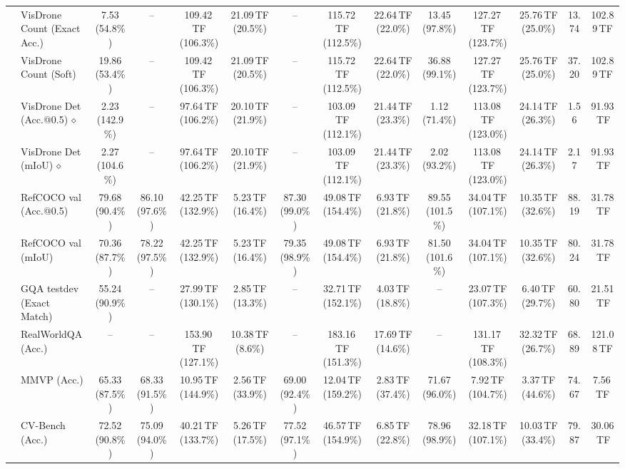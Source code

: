 \begin{table}[t]
\begin{center}
\begin{small}
\begin{sc}
{\begin{tabular}{llcccccccccccc}
& VisDrone Count (Exact Acc.) & 7.53 (54.8\%) & -- & 109.42\,TF (106.3\%) & 21.09\,TF (20.5\%) & -- & 115.72\,TF (112.5\%) & 22.64\,TF (22.0\%) & 13.45 (97.8\%) & 127.27\,TF (123.7\%) & 25.76\,TF (25.0\%) & 13.74 & 102.89\,TF \\
& VisDrone Count (Soft) & 19.86 (53.4\%) & -- & 109.42\,TF (106.3\%) & 21.09\,TF (20.5\%) & -- & 115.72\,TF (112.5\%) & 22.64\,TF (22.0\%) & 36.88 (99.1\%) & 127.27\,TF (123.7\%) & 25.76\,TF (25.0\%) & 37.20 & 102.89\,TF \\
& VisDrone Det (Acc.@0.5)\,$\diamond$ & 2.23 (142.9\%) & -- & 97.64\,TF (106.2\%) & 20.10\,TF (21.9\%) & -- & 103.09\,TF (112.1\%) & 21.44\,TF (23.3\%) & 1.12 (71.4\%) & 113.08\,TF (123.0\%) & 24.14\,TF (26.3\%) & 1.56 & 91.93\,TF \\
& VisDrone Det (mIoU)\,$\diamond$ & 2.27 (104.6\%) & -- & 97.64\,TF (106.2\%) & 20.10\,TF (21.9\%) & -- & 103.09\,TF (112.1\%) & 21.44\,TF (23.3\%) & 2.02 (93.2\%) & 113.08\,TF (123.0\%) & 24.14\,TF (26.3\%) & 2.17 & 91.93\,TF \\
\midrule
{}
& RefCOCO val (Acc.@0.5) & 79.68 (90.4\%) & 86.10 (97.6\%) & 42.25\,TF (132.9\%) & 5.23\,TF (16.4\%) & 87.30 (99.0\%) & 49.08\,TF (154.4\%) & 6.93\,TF (21.8\%) & 89.55 (101.5\%) & 34.04\,TF (107.1\%) & 10.35\,TF (32.6\%) & 88.19 & 31.78\,TF \\
& RefCOCO val (mIoU) & 70.36 (87.7\%) & 78.22 (97.5\%) & 42.25\,TF (132.9\%) & 5.23\,TF (16.4\%) & 79.35 (98.9\%) & 49.08\,TF (154.4\%) & 6.93\,TF (21.8\%) & 81.50 (101.6\%) & 34.04\,TF (107.1\%) & 10.35\,TF (32.6\%) & 80.24 & 31.78\,TF \\
& GQA testdev (Exact Match) & 55.24 (90.9\%) & -- & 27.99\,TF (130.1\%) & 2.85\,TF (13.3\%) & -- & 32.71\,TF (152.1\%) & 4.03\,TF (18.8\%) & -- & 23.07\,TF (107.3\%) & 6.40\,TF (29.7\%) & 60.80 & 21.51\,TF \\
& RealWorldQA (Acc.) & -- & -- & 153.90\,TF (127.1\%) & 10.38\,TF (8.6\%) & -- & 183.16\,TF (151.3\%) & 17.69\,TF (14.6\%) & -- & 131.17\,TF (108.3\%) & 32.32\,TF (26.7\%) & 68.89 & 121.08\,TF \\
& MMVP (Acc.) & 65.33 (87.5\%) & 68.33 (91.5\%) & 10.95\,TF (144.9\%) & 2.56\,TF (33.9\%) & 69.00 (92.4\%) & 12.04\,TF (159.2\%) & 2.83\,TF (37.4\%) & 71.67 (96.0\%) & 7.92\,TF (104.7\%) & 3.37\,TF (44.6\%) & 74.67 & 7.56\,TF \\
& CV-Bench (Acc.) & 72.52 (90.8\%) & 75.09 (94.0\%) & 40.21\,TF (133.7\%) & 5.26\,TF (17.5\%) & 77.52 (97.1\%) & 46.57\,TF (154.9\%) & 6.85\,TF (22.8\%) & 78.96 (98.9\%) & 32.18\,TF (107.1\%) & 10.03\,TF (33.4\%) & 79.87 & 30.06\,TF \\

\end{tabular}}
\end{sc}
\end{small}
\end{center}
\end{table}
